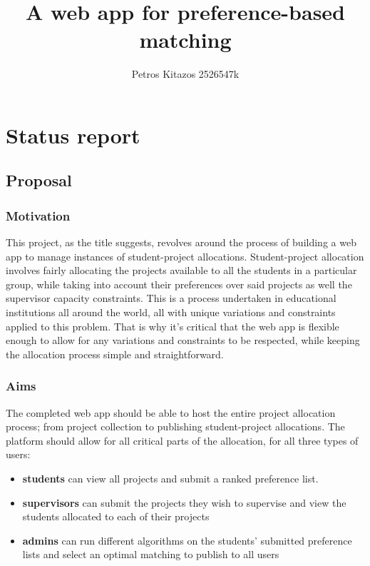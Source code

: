 \documentclass[11pt]{article}
\title{A web app for preference-based matching}
\author{Petros Kitazos 2526547k}
\begin{document}
\maketitle

\section{Status report}

\subsection{Proposal}\label{proposal}

\subsubsection{Motivation}\label{motivation}
This project, as the title suggests, revolves around the process of building a web app to manage instances of student-project allocations. Student-project allocation involves fairly allocating the projects available to all the students in a particular group, while taking into account their preferences over said projects as well the supervisor capacity constraints. This is a process undertaken in educational institutions all around the world, all with unique variations and constraints applied to this problem. That is why it's critical that the web app is flexible enough to allow for any variations and constraints to be respected, while keeping the allocation process simple and straightforward.

\subsubsection{Aims}\label{aims}
The completed web app should be able to host the entire project allocation process; from project collection to publishing student-project allocations. The platform should allow for all critical parts of the allocation, for all three types of users:
\begin{itemize}
    \item \textbf{students} can view all projects and submit a ranked preference list.
    \item \textbf{supervisors} can submit the projects they wish to supervise and view the students allocated to each of their projects
    \item \textbf{admins} can run different algorithms on the students' submitted preference lists and select an optimal matching to publish to all users 
\end{itemize}
\end{document}
